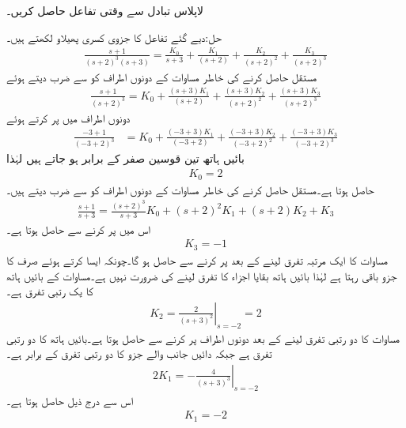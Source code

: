 لاپلاس تبادل  سے وقتی تفاعل حاصل کریں۔

حل:دیے گئے تفاعل کا جزوی کسری پھیلاو لکھتے ہیں۔
\begin{align}\label{مساوات_لاپلاس_مثال_کثیر_قطبین_الف}
\frac{s+1}{(s+2)^3(s+3)}=\frac{K_0}{s+3}+\frac{K_1}{(s+2)}+\frac{K_2}{(s+2)^2}+\frac{K_3}{(s+2)^3}
\end{align}
مستقل  حاصل کرنے کی خاطر مساوات کے دونوں اطراف کو  سے ضرب دیتے ہوئے
\begin{align*}
\frac{s+1}{(s+2)^3}=K_0+\frac{(s+3)K_1}{(s+2)}+\frac{(s+3)K_2}{(s+2)^2}+\frac{(s+3)K_3}{(s+2)^3}
\end{align*}
دونوں اطراف میں  پر کرتے ہوئے
\begin{align*}
\frac{-3+1}{(-3+2)^3}&=K_0+\frac{(-3+3)K_1}{(-3+2)}+\frac{(-3+3)K_2}{(-3+2)^2}+\frac{(-3+3)K_3}{(-3+2)^3}
\end{align*}
 بائیں ہاتھ تین قوسین صفر کے برابر ہو جاتے ہیں لہٰذا
\begin{align*}
K_0=2
\end{align*}
حاصل ہوتا ہے۔مستقل  حاصل کرنے کی خاطر مساوات  کے دونوں اطراف کو  سے ضرب دیتے ہیں۔
\begin{align}\label{مساوات_لاپلاس_مثال_کثیر_قطبین_ب}
\frac{s+1}{s+3}=\frac{(s+2)^3}{s+3}K_0+(s+2)^2 K_1+(s+2)K_2+K_3
\end{align}
اس میں  پر کرنے سے  حاصل ہوتا ہے۔
\begin{align*}
K_3=-1
\end{align*}
مساوات  کا ایک مرتبہ تفرق لینے کے بعد  پر کرنے سے  حاصل ہو گا۔چونکہ ایسا کرتے ہوئے صرف  کا جزو باقی رہتا ہے لہٰذا بائیں ہاتھ بقایا اجزاء کا تفرق  لینے کی ضرورت نہیں ہے۔مساوات کے بائیں ہاتھ کا یک رتبی تفرق  ہے۔
\begin{align*}
K_2=\left. \frac{2}{(s+3)^2} \right|_{s=-2}=2
\end{align*}
مساوات  کا دو رتبی تفرق لینے کے بعد دونوں اطراف  پر کرنے سے  حاصل ہوتا ہے۔بائیں ہاتھ کا دو رتبی تفرق  ہے جبکہ دائیں جانب  والے جزو کا دو رتبی تفرق  کے برابر ہے۔ 
\begin{align*}
2K_1=\left. -\frac{4}{(s+3)^3} \right|_{s=-2}
\end{align*}
اس سے درج ذیل حاصل ہوتا ہے۔
\begin{align*}
K_1=-2
\end{align*}
